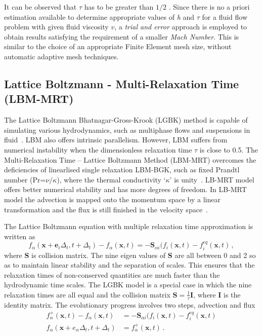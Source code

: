 It can be observed that $\tau$ has to be greater than $1/2$ 
\citep{He1997}. Since there is no a priori estimation available 
to determine appropriate values of \textit{h} and $\tau$ for a 
fluid flow problem with given fluid viscosity $\mathit{v}$, a 
\textit{trial and error} approach is employed to obtain results 
satisfying the requirement of a smaller \textit{Mach Number}. 
This is similar to the choice of an appropriate Finite Element 
mesh size, without automatic adaptive mesh techniques. 

\subsection{Lattice Boltzmann - Multi-Relaxation Time (LBM-MRT)}

The Lattice Boltzmann Bhatnagar-Gross-Krook (LGBK) method is capable of 
simulating various hydrodynamics, such as multiphase flows and 
suspensions in fluid~\citep{Succi1989,Succi2001}. LBM also offers intrinsic 
parallelism. However, LBM suffers from numerical instability when the 
dimensionless relaxation time $\tau$ is close to 0.5. The Multi-Relaxation Time 
-- Lattice Boltzmann Method (LBM-MRT) overcomes the deficiencies of linearlised 
single relaxation LBM-BGK, such as fixed Prandtl number (Pr=$\nu/\kappa$), 
where the thermal conductivity `$\kappa$' is unity~\citep{Liu2003a}. 
LB-MRT model offers better numerical stability and has more degrees of freedom. 
In LB-MRT model the advection is mapped onto the momentum space by a linear 
transformation and the flux is still finished in the velocity 
space~\citep{Du2006}.

The Lattice Boltzmann equation with multiple relaxation time approximation is 
written as
%
\begin{equation}
f_{\alpha}(\mathbf{x}+\mathbf{e}_i\Delta_t, t+ 
\Delta_t)-f_{\alpha}(\mathbf{x},t)=-\mathbf{S}_{\alpha 
	i}(f_i(\mathbf{x},t)-f_i^{eq}(\mathbf{x},t)\,,
\end{equation}
%
\noindent where \textbf{S} is collision matrix. The nine eigen values of 
\textbf{S} are all between 0 and 2 so as to maintain linear stability and the 
separation of scales. This ensures that the relaxation times of non-conserved 
quantities are much faster than the hydrodynamic time scales. The LGBK model is 
a special case in which the nine relaxation times are all equal and the 
collision matrix $\mathbf{S}=\frac{1}{\tau}\mathbf{I}$, where \textbf{I} is the 
identity matrix. The evolutionary progress involves two steps, advection and 
flux
%
\begin{align}
f_{\alpha}^+(\mathbf{x},t)-f_{\alpha}(\mathbf{x},t) & = -\mathbf{S}_{\alpha 
i}(f_i(\mathbf{x},t)-f_i^{eq}(\mathbf{x},t) \label{eq:advection}\\
f_{\alpha}(\mathbf{x}+e_{\alpha}\Delta_t, t+\Delta_t) & = 
f_{\alpha}^+(\mathbf{x},t)\,.
\end{align}

